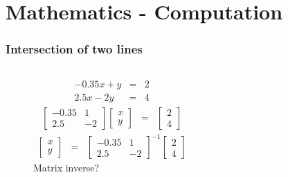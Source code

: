 \documentclass[xcolor=dvipsnames]{beamer}
\begin{document}
\section{Mathematics - Computation}


\begin{frame}[fragile]
  \frametitle{Intersection of two lines}
\begin{figure}
  \centering
  \begin{columns}
    \centering
  \begin{eqnarray*}
    -0.35x + y &=& 2\\
    2.5x - 2y &=& 4
  \end{eqnarray*}
  \begin{eqnarray*}
    \begin{bmatrix}
      -0.35 & 1 \\
      2.5 & -2
    \end{bmatrix}
    \begin{bmatrix}
      x \\
      y
    \end{bmatrix}
    &=&
    \begin{bmatrix}
      2 \\
      4
    \end{bmatrix}
  \end{eqnarray*}
  \begin{eqnarray*}
    \begin{bmatrix}
      x \\
      y
    \end{bmatrix}
    &=&
    \begin{bmatrix}
      -0.35 & 1 \\
      2.5 & -2
    \end{bmatrix}^{-1}
    \begin{bmatrix}
      2 \\
      4
    \end{bmatrix}
  \end{eqnarray*}
  Matrix inverse?
    \centering

\end{columns}
\end{figure}
\end{frame}
\end{document}
